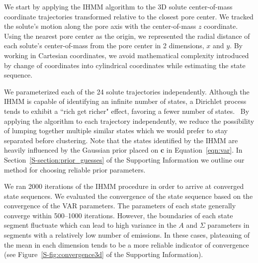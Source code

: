 \documentclass[journal=jpcbfk,manuscript=article]{achemso}
\begin{document}
  
  We start by applying the IHMM algorithm to the 3D solute center-of-mass coordinate 
  trajectories transformed relative to the closest pore center. We tracked the solute's
  motion along the pore axis with the center-of-mass $z$ coordinate. Using the nearest
  pore center as the origin, we represented the radial distance of each solute's 
  center-of-mass from the pore center in 2 dimensions, $x$ and $y$. By working in 
  Cartesian coordinates, we avoid mathematical complexity introduced by change of coordinates into cylindrical 
  coordinates while estimating the state sequence.

  We parameterized each of the 24 solute trajectories independently.
  Although the IHMM is capable of identifying an infinite number of states, 
  a Dirichlet process tends to exhibit a ``rich get richer" effect, favoring
  a fewer number of states.~\cite{dreyer_discovering_2011} By applying the algorithm to each trajectory 
  independently, we reduce the possibility of lumping together multiple 
  similar states which we would prefer to stay separated before clustering.
  Note that the states identified by the IHMM are heavily influenced by 
  the Gaussian prior placed on $\mathbf{c}$ in Equation~\ref{eqn:var}. 
  In Section~\ref{S-section:prior_guesses} of the Supporting Information we 
  outline our method for choosing reliable prior parameters. 

  We ran 2000 iterations of the IHMM procedure in order to arrive at converged 
  state sequences. We evaluated the convergence of the state sequence based on
  the convergence of the VAR parameters. The parameters of each state
  generally converge within 500--1000 iterations. However, the boundaries of 
  each state segment fluctuate which can lead to high variance in the $A$
  and $\Sigma$ parameters in segments with a relatively low number of emissions.
  In these cases, plateauing of the mean in each dimension tends to be a more 
  reliable indicator of convergence (see Figure~\ref{S-fig:convergence3d} of
  the Supporting Information).
  
\end{document}
